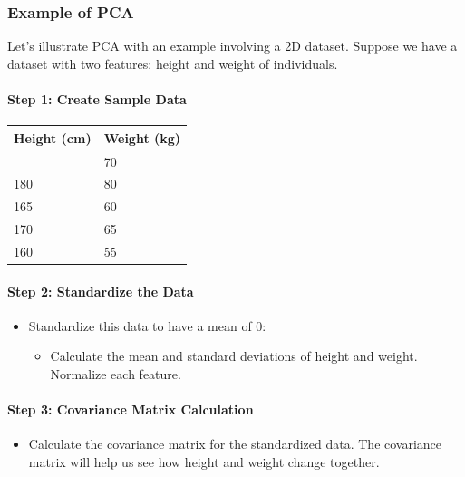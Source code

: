 \documentclass[12pt]{book}
\providecommand{\tightlist}{%
  \setlength{\itemsep}{0pt}\setlength{\parskip}{0pt}}
\begin{document}
\subsubsection{Example of PCA}\label{example-of-pca}

Let's illustrate PCA with an example involving a 2D dataset. Suppose we
have a dataset with two features: height and weight of individuals.

\paragraph{Step 1: Create Sample Data}\label{step-1-create-sample-data}

\begin{longtable}[]{@{}ll@{}}
\toprule\noalign{}
Height (cm) & Weight (kg) \\
\midrule\noalign{}
\endhead
\bottomrule\noalign{}
\endlastfoot
175 & 70 \\
180 & 80 \\
165 & 60 \\
170 & 65 \\
160 & 55 \\
\end{longtable}

\paragraph{Step 2: Standardize the
Data}\label{step-2-standardize-the-data}

\begin{itemize}
\tightlist
\item
  Standardize this data to have a mean of 0:

  \begin{itemize}
  \tightlist
  \item
    Calculate the mean and standard deviations of height and weight.
    Normalize each feature.
  \end{itemize}
\end{itemize}

\paragraph{Step 3: Covariance Matrix
Calculation}\label{step-3-covariance-matrix-calculation}

\begin{itemize}
\tightlist
\item
  Calculate the covariance matrix for the standardized data. The
  covariance matrix will help us see how height and weight change
  together.
\end{itemize}
\end{document}
